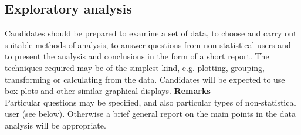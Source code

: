 \subsection{Exploratory analysis}
Candidates should be prepared to examine a set of data, to choose and carry out suitable methods of analysis, to answer questions from non-statistical users and to present the analysis and conclusions in the form of a short report. The techniques required may be of the simplest kind, e.g. plotting, grouping, transforming or calculating from the data. Candidates will be expected to use box-plots and other similar graphical displays.
\textbf{Remarks}\\
Particular questions may be specified, and also particular types of non-statistical user (see below). Otherwise a brief general report on the main points in the data analysis will be appropriate.




